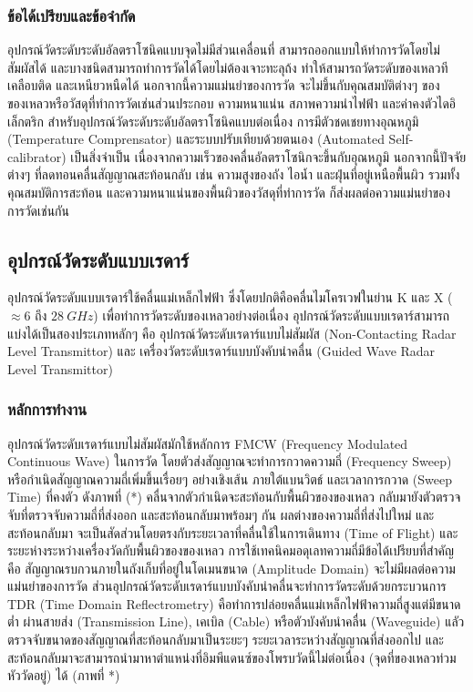 \documentclass[final,11pt]{article}
\begin{document}
\subsubsection{ข้อได้เปรียบและข้อจำกัด}
อุปกรณ์วัดระดับระดับอัลตราโซนิคแบบจุดไม่มีส่วนเคลื่อนที่ สามารถออกแบบให้ทำการวัดโดยไม่สัมผัสได้ และบางชนิดสามารถทำการวัดได้โดยไม่ต้องเจาะทะลุถ้ง 
ทำให้สามารถวัดระดับของเหลวทีเคลือบติด และเหนียวหนืดได้ นอกจากนี้ความแม่นยำของการวัด จะไม่ขึ้นกับคุณสมบัติต่างๆ 
ของของเหลวหรือวัสดุที่ทำการวัดเช่นส่วนประกอบ ความหนาแน่น สภาพความนำไฟฟ้า และค่าคงตัวไดอิเล็กตริก
สำหรับอุปกรณ์วัดระดับระดับอัลตราโซนิคแบบต่อเนื่อง การมีตัวชดเชยทางอุณหภูมิ (Temperature Comprensator) และระบบปรับเทียบด้วยตนเอง 
(Automated Self-calibrator) เป็นสิ่งจำเป็น เนื่องจากความเร็วของคลื่นอัลตราโซนิกจะขึ้นกับอุณหภูมิ นอกจากนี้ปัจจัยต่างๆ ที่ลดทอนคลื่นสัญญาณสะท้อนกลับ
เช่น ความสูงของถัง ไอน้ำ และฝุ่นที่อยู่เหนือพื้นผิว รวมทั้งคุณสมบัติการสะท้อน และความหนาแน่นของพื้นผิวของวัสดุที่ทำการวัด ก็ส่งผลต่อความแม่นยำของการวัดเช่นกัน

\subsection{อุปกรณ์วัดระดับแบบเรดาร์}
อุปกรณ์วัดระดับแบบเรดาร์ใช้คลื่นแม่เหล็กไฟฟ้า ซึ่งโดยปกติคือคลื่นไมโครเวฟในย่าน K และ X ($\approx 6$ ถึง $\SI{28}{GHz}$) 
เพื่อทำการวัดระดับของเหลวอย่างต่อเนื่อง อุปกรณ์วัดระดับแบบเรดาร์สามารถแบ่งได้เป็นสองประเภทหลักๆ คือ อุปกรณ์วัดระดับเรดาร์แบบไม่สัมผัส
(Non-Contacting Radar Level Transmittor) และ เครื่องวัดระดับเรดาร์แบบบังคับนำคลื่น (Guided Wave Radar Level Transmittor) 
\subsubsection{หลักการทำงาน} 
อุปกรณ์วัดระดับเรดาร์แบบไม่สัมผัสมักใช้หลักการ FMCW (Frequency Modulated Continuous Wave) ในการวัด 
โดยตัวส่งสัญญาณจะทำการกวาดความถี่ (Frequency Sweep) หรือกำเนิดสัญญาณความถี่เพิ่มขึ้นเรื่อยๆ อย่างเชิงเส้น ภายใต้แบนวิตธ์ และเวลาการกวาด
(Sweep Time) ที่คงตัว ดังภาพที่ (*) คลื่นจากตัวกำเนิดจะสะท้อนกับพื้นผิวของของเหลว กลับมายังตัวตรวจจับที่ตรวจจับความถี่ที่ส่งออก และสะท้อนกลับมาพร้อมๆ กัน
ผลต่างของความถี่ที่ส่งไปใหม่ และสะท้อนกลับมา จะเป็นสัดส่วนโดยตรงกับระยะเวลาที่คลื่นใช้ในการเดินทาง (Time of Flight) 
และระยะห่างระหว่างเครื่องวัดกับพื้นผิวของของเหลว การใช้เทคนิคมอดุเลทความถี่มีข้อได้เปรียบที่สำคัญคือ สัญญาณรบกวนภายในถังเก็บที่อยู่ในโดเมนขนาด 
(Amplitude Domain) จะไม่มีผลต่อความแม่นยำของการวัด ส่วนอุปกรณ์วัดระดับเรดาร์แบบบังคับนำคลื่นจะทำการวัดระดับด้วยกระบวนการ TDR 
(Time Domain Reflectrometry) คือทำการปล่อยคลื่นแม่เหล็กไฟฟ้าความถี่สูงแต่มีขนาดต่ำ ผ่านสายส่ง (Transmission Line), เคเบิล (Cable) 
หรือตัวบังคับนำคลื่น (Waveguide) แลัวตรวจจับขนาดของสัญญาณที่สะท้อนกลับมาเป็นระยะๆ ระยะเวลาระหว่างสัญญาณที่ส่งออกไป 
และสะท้อนกลับมาจะสามารถนำมาหาตำแหน่งที่อิมพีแดนซ์ของโพรบวัดนี้ไม่ต่อเนื่อง (จุดที่ของเหลวท่วมหัววัดอยู่) ได้ (ภาพที่ *)
\end{document}

